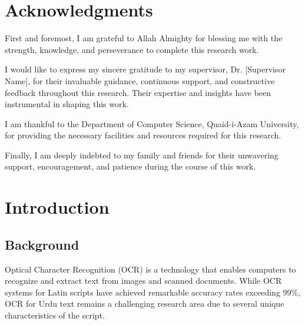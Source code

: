 \documentclass[12pt,a4paper,oneside]{report}
\begin{document}
\chapter*{Acknowledgments}

First and foremost, I am grateful to Allah Almighty for blessing me with the strength, knowledge, and perseverance to complete this research work.

I would like to express my sincere gratitude to my supervisor, Dr. [Supervisor Name], for their invaluable guidance, continuous support, and constructive feedback throughout this research. Their expertise and insights have been instrumental in shaping this work.

I am thankful to the Department of Computer Science, Quaid-i-Azam University, for providing the necessary facilities and resources required for this research.

Finally, I am deeply indebted to my family and friends for their unwavering support, encouragement, and patience during the course of this work.

\tableofcontents
\listoffigures
\listoftables

\chapter{Introduction}

\section{Background}

Optical Character Recognition (OCR) is a technology that enables computers to recognize and extract text from images and scanned documents. While OCR systems for Latin scripts have achieved remarkable accuracy rates exceeding 99\%, OCR for Urdu text remains a challenging research area due to several unique characteristics of the script.
\end{document}
